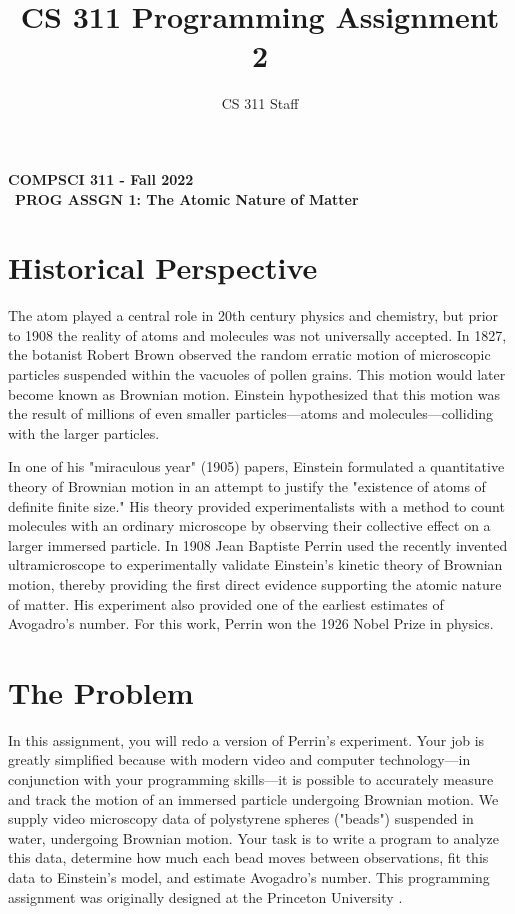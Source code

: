 \documentclass[]{article}
\title{\vspace{-1in}CS 311 Programming Assignment 2}
\author{CS 311 Staff}
\begin{document}
\begin{center}
{\Large \bf COMPSCI 311 - Fall 2022}\\\
{\Large \bf PROG ASSGN 1: The Atomic Nature of Matter}
\end{center}

\noindent

\section{Historical Perspective}

The atom played a central role in 20th century physics and chemistry, but prior to 1908 the reality of atoms and molecules was not universally accepted. In 1827, the botanist Robert Brown observed the random erratic motion of microscopic particles suspended within the vacuoles of pollen grains. This motion would later become known as Brownian motion. Einstein hypothesized that this motion was the result of millions of even smaller particles—atoms and molecules—colliding with the larger particles.

In one of his "miraculous year" (1905) papers, Einstein formulated a quantitative theory of Brownian motion in an attempt to justify the "existence of atoms of definite finite size." His theory provided experimentalists with a method to count molecules with an ordinary microscope by observing their collective effect on a larger immersed particle. In 1908 Jean Baptiste Perrin used the recently invented ultramicroscope to experimentally validate Einstein's kinetic theory of Brownian motion, thereby providing the first direct evidence supporting the atomic nature of matter. His experiment also provided one of the earliest estimates of Avogadro's number. For this work, Perrin won the 1926 Nobel Prize in physics.

\section{The Problem}

 In this assignment, you will redo a version of Perrin's experiment. Your job is greatly simplified because with modern video and computer technology—in conjunction with your programming skills—it is possible to accurately measure and track the motion of an immersed particle undergoing Brownian motion. We supply video microscopy data of polystyrene spheres ("beads") suspended in water, undergoing Brownian motion. Your task is to write a program to analyze this data, determine how much each bead moves between observations, fit this data to Einstein's model, and estimate Avogadro's number. This programming assignment was originally designed at the Princeton University \cite{PrincetonAvogadroAssignment}.
\end{document}
